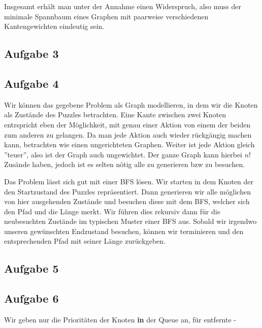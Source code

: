 \documentclass[a4paper,graphics,11pt]{article}
\newcommand{\aufgabe}[1]{\subsection*{Aufgabe #1}}
\begin{document}
Insgesamt erhält man unter der Annahme einen Widerspruch, also muss der minimale Spannbaum eines Graphen mit paarweise verschiedenen
Kantengewichten eindeutig sein.


\aufgabe{3}

\newpage

\aufgabe{4}
Wir können das gegebene Problem als Graph modellieren, in dem wir die Knoten als Zustände des Puzzles betrachten. Eine Kante
zwischen zwei Knoten entrspricht eben der Möglichkeit, mit genau einer Aktion von einem der beiden zum anderen zu gelangen.
Da man jede Aktion auch wieder rückgängig machen kann, betrachten wie einen ungerichteten Graphen. Weiter ist jede Aktion
gleich ''teuer'', also ist der Graph auch ungewichtet. Der ganze Graph kann hierbei $n!$ Zusände haben, jedoch ist es selten
nötig alle zu generieren bzw zu besuchen.

Das Problem lässt sich gut mit einer BFS lösen. Wir starten in dem Knoten der den Startzustand des Puzzles repräsentiert.
Dann generieren wir alle möglichen von hier ausgehenden Zustände und besuchen diese mit dem BFS, welcher sich den Pfad und die
Länge merkt. Wir führen dies rekursiv dann für die neubesuchten Zustände im typischen Muster einer BFS aus. Sobald wir irgendwo unseren gewünschten Endzustand besuchen, können wir terminieren und den entsprechenden Pfad
mit seiner Länge zurückgeben.

\newpage

\aufgabe{5}

\newpage

\aufgabe{6}

Wir geben nur die Prioritäten der Knoten \textbf{in} der Queue an, für entfernte -
\end{document}
